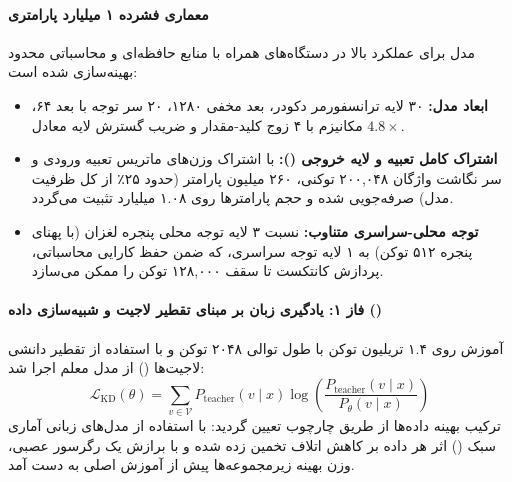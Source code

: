 \item {}

\paragraph*{معماری فشرده ۱ میلیارد پارامتری}
مدل  \cite{mobilellm_pro_2025} برای عملکرد بالا در دستگاه‌های همراه با منابع حافظه‌ای و محاسباتی محدود بهینه‌سازی شده است:
\begin{itemize}
    \item \textbf{ابعاد مدل:} ۳۰ لایه ترانسفورمر دکودر، بعد مخفی ۱۲۸۰، ۲۰ سر توجه با بعد ۶۴، مکانیزم  با ۴ زوج کلید-مقدار و ضریب گسترش لایه  معادل $4.8\times$.
    \item \textbf{اشتراک کامل تعبیه و لایه خروجی ():} با اشتراک وزن‌های ماتریس تعبیه ورودی و سر نگاشت واژگان ۲۰۰,۰۴۸ توکنی، ۲۶۰ میلیون پارامتر (حدود ۲۵٪ از کل ظرفیت مدل) صرفه‌جویی شده و حجم پارامترها روی ۱.۰۸ میلیارد تثبیت می‌گردد.
    \item \textbf{توجه محلی-سراسری متناوب:} نسبت ۳ لایه توجه محلی پنجره لغزان (با پهنای پنجره ۵۱۲ توکن) به ۱ لایه توجه سراسری، که ضمن حفظ کارایی محاسباتی، پردازش کانتکست تا سقف ۱۲۸,۰۰۰ توکن را ممکن می‌سازد.
\end{itemize}

\paragraph*{فاز ۱: یادگیری زبان بر مبنای تقطیر لاجیت و شبیه‌سازی داده ()}
آموزش روی ۱.۴ تریلیون توکن با طول توالی ۲۰۴۸ توکن و با استفاده از تقطیر دانشی لاجیت‌ها () از مدل معلم  اجرا شد:
\begin{equation}
    \mathcal{L}_{\text{KD}}(\theta) = \sum_{v \in \mathcal{V}} P_{\text{teacher}}(v \mid x) \log \left( \frac{P_{\text{teacher}}(v \mid x)}{P_\theta(v \mid x)} \right)
\end{equation}
ترکیب بهینه داده‌ها از طریق چارچوب  تعیین گردید: با استفاده از مدل‌های زبانی آماری سبک () اثر هر داده بر کاهش اتلاف تخمین زده شده و با برازش یک رگرسور عصبی، وزن بهینه زیرمجموعه‌ها پیش از آموزش اصلی به دست آمد.

